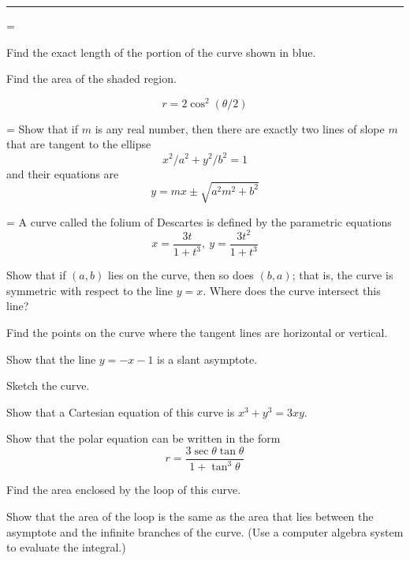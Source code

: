 \documentclass[a4paper,12pt,twocolumn]{article}
\newlength{\problemnumberwidth}
\newcommand{\problemtitle}[2]{%
  \hypertarget{#1}{}%
  \par\vspace{0.4em}%
  \noindent{\large\bfseries #2}\par
  \vspace{0.3em}%
  \hrule
  \vspace{0.9em}%
}
\newcommand{\problem}[2]{%
  \par\noindent
  \hangindent=\problemnumberwidth
  \hangafter=1
  \makebox[\problemnumberwidth][l]{\textbf{#1.}}#2\par
  \vspace{1.4em}%
}
\begin{document}
\problemtitle{sec:10-review}{10 Review}

\problem{44}{%
\begin{subparts}
\item Find the exact length of the portion of the curve shown in blue.
\item Find the area of the shaded region.
\end{subparts}
\[
r=2\cos^2(\theta/2)
\]}

\problem{58}{Show that if \(m\) is any real number, then there are exactly two lines of slope \(m\) that are tangent to the ellipse
\[
x^2/a^2+y^2/b^2=1
\]
and their equations are
\[
y=mx\pm\sqrt{a^2m^2+b^2}
\]}

\problem{62}{A curve called the folium of Descartes is defined by the parametric equations
\[
x=\frac{3t}{1+t^3},\ y=\frac{3t^2}{1+t^3}
\]
\begin{subparts}
\item Show that if \((a,b)\) lies on the curve, then so does \((b,a)\); that is, the curve is symmetric with respect to the line \(y=x\). Where does the curve intersect this line?
\item Find the points on the curve where the tangent lines are horizontal or vertical.
\item Show that the line \(y=-x-1\) is a slant asymptote.
\item Sketch the curve.
\item Show that a Cartesian equation of this curve is \(x^3+y^3=3xy\).
\item Show that the polar equation can be written in the form
\[
r=\frac{3\sec\theta\tan\theta}{1+\tan^3\theta}
\]
\item Find the area enclosed by the loop of this curve.
\item Show that the area of the loop is the same as the area that lies between the asymptote and the infinite branches of the curve. (Use a computer algebra system to evaluate the integral.)
\end{subparts}}
\end{document}
